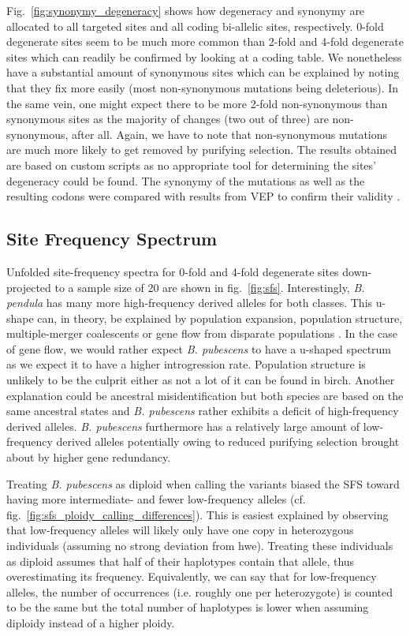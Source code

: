 \documentclass[hidelinks,11pt]{article}
\newcommand{\pendula}{\textit{B. pendula}}
\newcommand{\pubescens}{\textit{B. pubescens}}
\begin{document}
{    Fig.~\ref{fig:synonymy_degeneracy} shows how degeneracy and synonymy are allocated to all targeted sites and all coding bi-allelic sites, respectively. 0-fold degenerate sites seem to be much more common than 2-fold and 4-fold degenerate sites which can readily be confirmed by looking at a coding table. We nonetheless have a substantial amount of synonymous sites which can be explained by noting that they fix more easily (most non-synonymous mutations being deleterious). In the same vein, one might expect there to be more 2-fold non-synonymous than synonymous sites as the majority of changes (two out of three) are non-synonymous, after all. Again, we have to note that non-synonymous mutations are much more likely to get removed by purifying selection. The results obtained are based on custom scripts as no appropriate tool for determining the sites' degeneracy could be found. The synonymy of the mutations as well as the resulting codons were compared with results from VEP to confirm their validity \cite{vep}.

    \subsection{Site Frequency Spectrum}
    \label{sec:sfs}

    Unfolded site-frequency spectra for 0-fold and 4-fold degenerate sites down-projected to a sample size of 20 are shown in fig.~\ref{fig:sfs}. Interestingly, \pendula{} has many more high-frequency derived alleles for both classes. This u-shape can, in theory, be explained by population expansion, population structure, multiple-merger coalescents or gene flow from disparate populations \cite{u-shape-gene-flow}. In the case of gene flow, we would rather expect \pubescens{} to have a u-shaped spectrum as we expect it to have a higher introgression rate. Population structure is unlikely to be the culprit either as not a lot of it can be found in birch. Another explanation could be ancestral misidentification but both species are based on the same ancestral states and \pubescens{} rather exhibits a deficit of high-frequency derived alleles. \pubescens{} furthermore has a relatively large amount of low-frequency derived alleles potentially owing to reduced purifying selection brought about by higher gene redundancy.

    Treating \pubescens{} as diploid when calling the variants biased the SFS toward having more intermediate- and fewer low-frequency alleles (cf. fig.~\ref{fig:sfs_ploidy_calling_differences}). This is easiest explained by observing that low-frequency alleles will likely only have one copy in heterozygous individuals (assuming no strong deviation from \acrshort{hwe}). Treating these individuals as diploid assumes that half of their haplotypes contain that allele, thus overestimating its frequency. Equivalently, we can say that for low-frequency alleles, the number of occurrences (i.e. roughly one per heterozygote) is counted to be the same but the total number of haplotypes is lower when assuming diploidy instead of a higher ploidy.

}
\end{document}
